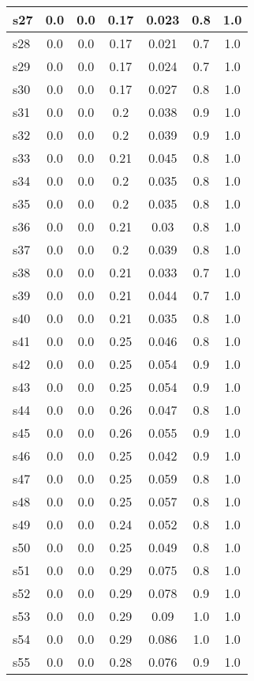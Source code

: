 \documentclass{article}
\begin{document}
\begin{tabular}{|l|c|c|c|c|c|c|}
\hline
s27 &0.0 & 0.0 & 0.17 & 0.023 & 0.8 & 1.0\\
\hline
s28 &0.0 & 0.0 & 0.17 & 0.021 & 0.7 & 1.0\\
\hline
s29 &0.0 & 0.0 & 0.17 & 0.024 & 0.7 & 1.0\\
\hline
s30 &0.0 & 0.0 & 0.17 & 0.027 & 0.8 & 1.0\\
\hline
s31 &0.0 & 0.0 & 0.2 & 0.038 & 0.9 & 1.0\\
\hline
s32 &0.0 & 0.0 & 0.2 & 0.039 & 0.9 & 1.0\\
\hline
s33 &0.0 & 0.0 & 0.21 & 0.045 & 0.8 & 1.0\\
\hline
s34 &0.0 & 0.0 & 0.2 & 0.035 & 0.8 & 1.0\\
\hline
s35 &0.0 & 0.0 & 0.2 & 0.035 & 0.8 & 1.0\\
\hline
s36 &0.0 & 0.0 & 0.21 & 0.03 & 0.8 & 1.0\\
\hline
s37 &0.0 & 0.0 & 0.2 & 0.039 & 0.8 & 1.0\\
\hline
s38 &0.0 & 0.0 & 0.21 & 0.033 & 0.7 & 1.0\\
\hline
s39 &0.0 & 0.0 & 0.21 & 0.044 & 0.7 & 1.0\\
\hline
s40 &0.0 & 0.0 & 0.21 & 0.035 & 0.8 & 1.0\\
\hline
s41 &0.0 & 0.0 & 0.25 & 0.046 & 0.8 & 1.0\\
\hline
s42 &0.0 & 0.0 & 0.25 & 0.054 & 0.9 & 1.0\\
\hline
s43 &0.0 & 0.0 & 0.25 & 0.054 & 0.9 & 1.0\\
\hline
s44 &0.0 & 0.0 & 0.26 & 0.047 & 0.8 & 1.0\\
\hline
s45 &0.0 & 0.0 & 0.26 & 0.055 & 0.9 & 1.0\\
\hline
s46 &0.0 & 0.0 & 0.25 & 0.042 & 0.9 & 1.0\\
\hline
s47 &0.0 & 0.0 & 0.25 & 0.059 & 0.8 & 1.0\\
\hline
s48 &0.0 & 0.0 & 0.25 & 0.057 & 0.8 & 1.0\\
\hline
s49 &0.0 & 0.0 & 0.24 & 0.052 & 0.8 & 1.0\\
\hline
s50 &0.0 & 0.0 & 0.25 & 0.049 & 0.8 & 1.0\\
\hline
s51 &0.0 & 0.0 & 0.29 & 0.075 & 0.8 & 1.0\\
\hline
s52 &0.0 & 0.0 & 0.29 & 0.078 & 0.9 & 1.0\\
\hline
s53 &0.0 & 0.0 & 0.29 & 0.09 & 1.0 & 1.0\\
\hline
s54 &0.0 & 0.0 & 0.29 & 0.086 & 1.0 & 1.0\\
\hline
s55 &0.0 & 0.0 & 0.28 & 0.076 & 0.9 & 1.0\\

\end{tabular}
\end{document}
